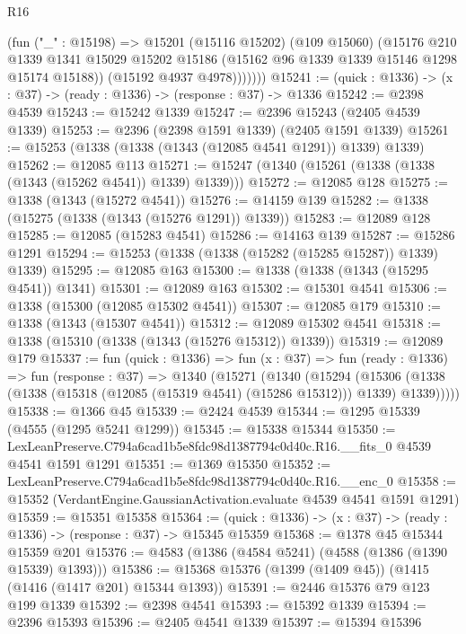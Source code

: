 \begin{lexlean}{R16}
\begin{coremodule}
              (fun ("_" : @15198) =>
              @15201
                (@15116 @15202)
                (@109 @15060)
                (@15176
                  @210
                  @1339
                  @1341
                  @15029
                  @15202
                  @15186
                  (@15162 @96 @1339 @1339 @15146 @1298 @15174 @15188))
                (@15192 @4937 @4978)))))))
@15241 := (quick : @1336) -> (x : @37) -> (ready : @1336) -> (response : @37) -> @1336
@15242 := @2398 @4539
@15243 := @15242 @1339
@15247 := @2396 @15243 (@2405 @4539 @1339)
@15253 := @2396 (@2398 @1591 @1339) (@2405 @1591 @1339)
@15261 := @15253 (@1338 (@1338 (@1343 (@12085 @4541 @1291)) @1339) @1339)
@15262 := @12085 @113
@15271 := @15247 (@1340 (@15261 (@1338 (@1338 (@1343 (@15262 @4541)) @1339) @1339)))
@15272 := @12085 @128
@15275 := @1338 (@1343 (@15272 @4541))
@15276 := @14159 @139
@15282 := @1338 (@15275 (@1338 (@1343 (@15276 @1291)) @1339))
@15283 := @12089 @128
@15285 := @12085 (@15283 @4541)
@15286 := @14163 @139
@15287 := @15286 @1291
@15294 := @15253 (@1338 (@1338 (@15282 (@15285 @15287)) @1339) @1339)
@15295 := @12085 @163
@15300 := @1338 (@1338 (@1343 (@15295 @4541)) @1341)
@15301 := @12089 @163
@15302 := @15301 @4541
@15306 := @1338 (@15300 (@12085 @15302 @4541))
@15307 := @12085 @179
@15310 := @1338 (@1343 (@15307 @4541))
@15312 := @12089 @15302 @4541
@15318 := @1338 (@15310 (@1338 (@1343 (@15276 @15312)) @1339))
@15319 := @12089 @179
@15337 := fun (quick : @1336) =>
  fun (x : @37) =>
  fun (ready : @1336) =>
  fun (response : @37) =>
  @1340
    (@15271
      (@1340
        (@15294
          (@15306 (@1338 (@1338 (@15318 (@12085 (@15319 @4541) (@15286 @15312))) @1339) @1339)))))
@15338 := @1366 @45
@15339 := @2424 @4539
@15344 := @1295 @15339 (@4555 (@1295 @5241 @1299))
@15345 := @15338 @15344
@15350 := LexLeanPreserve.C794a6cad1b5e8fdc98d1387794c0d40c.R16.__fits_0 @4539 @4541 @1591 @1291
@15351 := @1369 @15350
@15352 := LexLeanPreserve.C794a6cad1b5e8fdc98d1387794c0d40c.R16.__enc_0
@15358 := @15352 (VerdantEngine.GaussianActivation.evaluate @4539 @4541 @1591 @1291)
@15359 := @15351 @15358
@15364 := (quick : @1336) -> (x : @37) -> (ready : @1336) -> (response : @37) -> @15345 @15359
@15368 := @1378 @45 @15344 @15359 @201
@15376 := @4583 (@1386 (@4584 @5241) (@4588 (@1386 (@1390 @15339) @1393)))
@15386 := @15368 @15376 (@1399 (@1409 @45)) (@1415 (@1416 (@1417 @201) @15344 @1393))
@15391 := @2446 @15376 @79 @123 @199 @1339
@15392 := @2398 @4541
@15393 := @15392 @1339
@15394 := @2396 @15393
@15396 := @2405 @4541 @1339
@15397 := @15394 @15396

\end{coremodule}
\end{lexlean}
